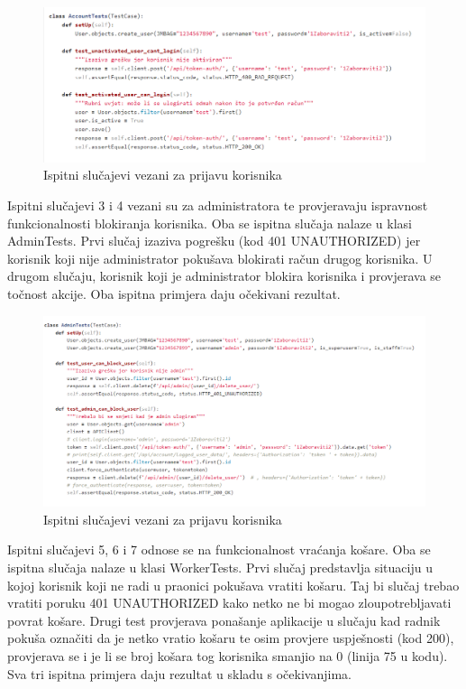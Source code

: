 			\begin{figure}[H]
				\centering
				\includegraphics[scale=0.65]{slike/AccountTests.PNG}
				\caption{Ispitni slučajevi vezani za prijavu korisnika}
				\label{fig:promjene}
			\end{figure}
		
			Ispitni slučajevi 3 i 4 vezani su za administratora te provjeravaju ispravnost funkcionalnosti blokiranja korisnika. Oba se ispitna slučaja nalaze u klasi AdminTests. Prvi slučaj izaziva pogrešku (kod 401 UNAUTHORIZED) jer korisnik koji nije administrator pokušava blokirati račun drugog korisnika. U drugom slučaju, korisnik koji je administrator blokira korisnika i provjerava se točnost akcije. Oba ispitna primjera daju očekivani rezultat.
			
			\begin{figure}[H]
				\centering
				\includegraphics[scale=0.65]{slike/AdminTests.PNG}
				\caption{Ispitni slučajevi vezani za prijavu korisnika}
				\label{fig:promjene}
			\end{figure}
	
			Ispitni slučajevi 5, 6 i 7 odnose se na funkcionalnost vraćanja košare. Oba se ispitna slučaja nalaze u klasi WorkerTests. Prvi slučaj predstavlja situaciju u kojoj korisnik koji ne radi u praonici pokušava vratiti košaru. Taj bi slučaj trebao vratiti poruku 401 UNAUTHORIZED kako netko ne bi mogao zloupotrebljavati povrat košare. Drugi test provjerava ponašanje aplikacije u slučaju kad radnik pokuša označiti da je netko vratio košaru te osim provjere uspješnosti (kod 200), provjerava se i je li se broj košara tog korisnika smanjio na 0 (linija 75 u kodu). Sva tri ispitna primjera daju rezultat u skladu s očekivanjima.
			
